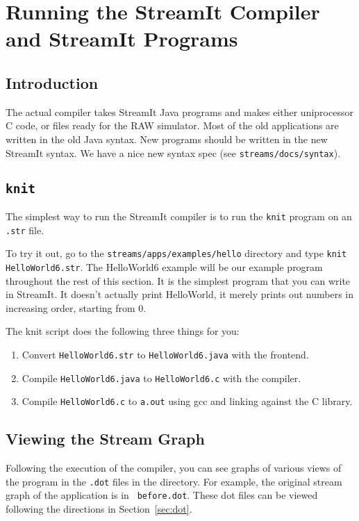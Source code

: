 \section{Running the StreamIt Compiler and StreamIt Programs}

\subsection{Introduction}
The actual compiler takes StreamIt Java programs and makes either 
uniprocessor C code, or files ready for the RAW simulator. Most
of the old applications are written in the old Java syntax. 
New programs should be written in the new StreamIt syntax.
We have a nice new syntax spec (see {\tt streams/docs/syntax}).


\subsection{{\tt knit}}
The simplest way to run the StreamIt compiler is to run the 
{\tt knit} program on an {\tt .str} file. 

To try it out, go to the {\tt streams/apps/examples/hello}
directory and type {\tt knit HelloWorld6.str}. The HelloWorld6 example
will be our example program throughout the rest of this section. 
It is the simplest program that you can write in StreamIt. It doesn't
actually print HelloWorld, it merely prints out numbers in
increasing order, starting from 0.

The knit script does the following three things for you:
\begin{enumerate}
  \item Convert {\tt HelloWorld6.str} to {\tt HelloWorld6.java} with the frontend.
  \item Compile {\tt HelloWorld6.java} to {\tt HelloWorld6.c} with the compiler.
  \item Compile {\tt HelloWorld6.c} to {\tt a.out} using gcc and linking against the C library.
\end{enumerate}

\subsection{Viewing the Stream Graph}
Following the execution of the compiler, you can see graphs of various
views of the program in the {\tt .dot} files in the directory.  For
example, the original stream graph of the application is in {\tt
before.dot}.  These dot files can be viewed following the directions
in Section~\ref{sec:dot}.

